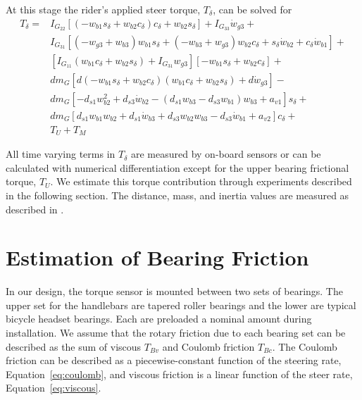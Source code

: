 \documentclass[10pt]{article}
\begin{document}
At this stage the rider's applied steer torque, $T_\delta$, can be solved for
%
\begin{align}
  T_{\delta} =
    & I_{G_{22}} \left[ \left( -w_{b1} s_\delta + w_{b2} c_\delta \right)
      c_\delta + w_{b2} s_\delta \right] + I_{G_{33}} \dot{w}_{g3} + \nonumber \\
    & I_{G_{31}} \left[ (-w_{g3} + w_{b3} ) w_{b1} s_\delta +
      (-w_{b3} + w_{g3}) w_{b2} c_\delta +
      s_\delta \dot{w}_{b2} + c_\delta \dot{w}_{b1} \right] + \nonumber \\
    & \left[ I_{G_{11}} (w_{b1} c_\delta + w_{b2}s_\delta) +
      I_{G_{31}} w_{g3} \right] \left[-w_{b1} s_\delta +
      w_{b2} c_\delta \right] + \nonumber \\
    & d m_G \left[ d (-w_{b1} s_\delta + w_{b2} c_\delta)
      (w_{b1} c_\delta + w_{b2} s_\delta) + d \dot{w}_{g3} \right] - \nonumber \\
    & d m_G \left[-d_{s1} w_{b2}^{2} + d_{s3} \dot{w}_{b2} -
      (d_{s1} w_{b3} - d_{s3} w_{b1}) w_{b3} + a_{v1} \right] s_\delta + \nonumber \\
    & d m_G \left[d_{s1} w_{b1} w_{b2} + d_{s1} \dot{w}_{b3} +
      d_{s3} w_{b2} w_{b3} - d_{s3} \dot{w}_{b1} + a_{v2} \right]
      c_\delta + \nonumber \\
    & T_U + T_M
\end{align}

All time varying terms in $T_\delta$ are measured by on-board sensors or can be
calculated with numerical differentiation except for the upper bearing
frictional torque, $T_U$. We estimate this torque contribution through
experiments described in the following section. The distance, mass, and inertia
values are measured as described in \cite{Moore2012}.

\section*{Estimation of Bearing Friction}
\label{sec:bearing-friction}

In our design, the torque sensor is mounted between two sets of bearings. The
upper set for the handlebars are tapered roller bearings and the lower are
typical bicycle headset bearings. Each are preloaded a nominal amount during
installation. We assume that the rotary friction due to each bearing set can be
described as the sum of viscous $T_{Bv}$ and Coulomb friction $T_{Bc}$. The
Coulomb friction can be described as a piecewise-constant function of the
steering rate, Equation~\ref{eq:coulomb}, and viscous friction is a linear
function of the steer rate, Equation~\ref{eq:viscous}.
\end{document}
